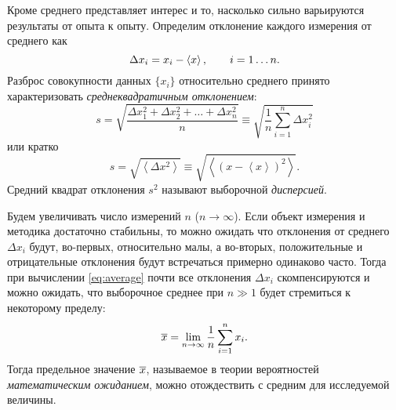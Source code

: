 

Кроме среднего представляет интерес и то, насколько сильно варьируются
результаты от опыта к опыту. Определим отклонение каждого измерения от среднего как
\[
\Delta x_{i}=x_{i}-\left<x\right>,\qquad i=1\ldots n.
\]
Разброс совокупности данных $\{x_i\}$ относительно среднего принято характеризовать
\emph{среднеквадратичным отклонением}:
\begin{equation}
s = \sqrt{\frac{\Delta x_{1}^{2}+\Delta x_{2}^{2}+\ldots+\Delta
x_{n}^{2}}{n}}\equiv \sqrt{\frac{1}{n}\sum\limits _{i=1}^{n}\Delta
x_{i}^{2}}\label{eq:sigma}
\end{equation}
или кратко
\begin{equation}
s = \sqrt{\left<\Delta x^{2}\right>} \equiv \sqrt{\left<(x-\left<x\right>)^{2}\right>}.\label{eq:sigma_s}
\end{equation}
Средний квадрат отклонения $s^{2}$ называют выборочной \emph{дисперсией}.

%

Будем увеличивать число измерений $n$ ($n\to \infty$). Если объект измерения и методика
достаточно стабильны, то можно ожидать что отклонения от среднего $\Delta x_i$ будут, во-первых,
относительно малы, а во-вторых, положительные и отрицательные отклонения будут
встречаться примерно одинаково часто. Тогда при вычислении \eqref{eq:average}
почти все отклонения $\Delta x_i$ скомпенсируются и можно ожидать,
что выборочное среднее при $n\gg 1$ будет стремиться к некоторому пределу:
\[
\overline{x} = \lim_{n\to\infty}\frac{1}{n}\sum_{i=1}^{n}x_{i}.
\]
Тогда предельное значение $\overline{x}$, называемое в теории вероятностей \emph{математическим ожиданием}, 
можно отождествить с  средним для исследуемой величины.

